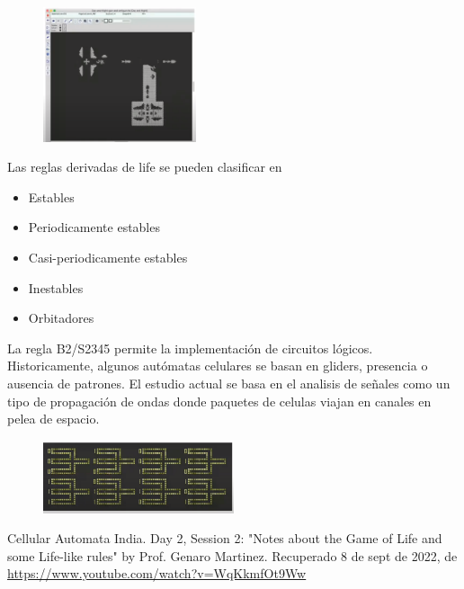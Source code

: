 \documentclass[10pt]{article}
\begin{document}
\begin{figure}[h!]
    \centering
    \includegraphics[width=0.4\textwidth]{dianoche.png}
\end{figure}
\newpage
Las reglas derivadas de life se pueden clasificar en 
\begin{itemize}
    \item Estables
    \item Periodicamente estables
    \item Casi-periodicamente estables
    \item Inestables
    \item Orbitadores
\end{itemize}

La regla B2/S2345 permite la implementación de circuitos lógicos. Historicamente, algunos autómatas celulares se basan en gliders, presencia o ausencia de patrones. El estudio actual se basa en el analisis de señales como un tipo de propagación de ondas donde paquetes de celulas viajan en canales en pelea de espacio.


    \begin{figure}[h!]
        \centering
        \includegraphics[width=0.5\textwidth]{b2.png}
    \end{figure}
    
    \begin{thebibliography}{1}
        Cellular Automata India. Day 2, Session 2: "Notes about the Game of Life and some Life-like rules" by Prof. Genaro Martinez. Recuperado 8 de sept de 2022, de \url{https://www.youtube.com/watch?v=WqKkmfOt9Ww}

    \end{thebibliography}
    
\end{document}
